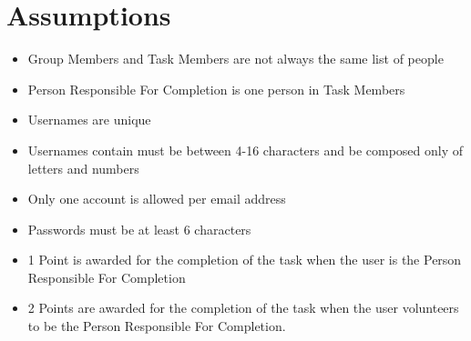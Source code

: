 \documentclass[11pt, a4paper]{report}
\begin{document}
\section{Assumptions}
\begin{itemize}
\item Group Members and Task Members are not always the same list of people
\item Person Responsible For Completion is one person in Task Members
\item Usernames are unique
\item Usernames contain must be between 4-16 characters and be composed only of letters and numbers
\item Only one account is allowed per email address
\item Passwords must be at least 6 characters
\item 1 Point is awarded for the completion of the task when the user is the Person Responsible For Completion
\item 2 Points are awarded for the completion of the task when the user volunteers to be the Person Responsible For Completion.
\end{itemize}
\end{document}
